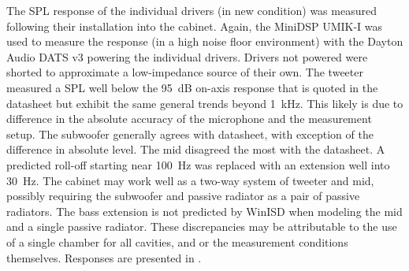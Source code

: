 The SPL response of the individual drivers (in new condition) was measured following their installation into the cabinet. Again, the MiniDSP UMIK-I was used to measure the response (in a high noise floor environment) with the Dayton Audio DATS v3 powering the individual drivers. Drivers not powered were shorted to approximate a low-impedance source of their own. The tweeter measured a SPL well below the \SI{95}{\dB} on-axis response that is quoted in the datasheet but exhibit the same general trends beyond \SI{1}{\kilo\hertz}. This likely is due to difference in the absolute accuracy of the microphone and the measurement setup. The subwoofer generally agrees with datasheet, with exception of the difference in absolute level. The mid disagreed the most with the datasheet. A predicted roll-off starting near \SI{100}{\hertz} was replaced with an extension well into \SI{30}{\hertz}. The cabinet may work well as a two-way system of tweeter and mid, possibly requiring the subwoofer and passive radiator as a pair of passive radiators. The bass extension is not predicted by WinISD when modeling the mid and a single passive radiator. These discrepancies may be attributable to the use of a single chamber for all cavities, and or the measurement conditions themselves. Responses are presented in .\par
%
